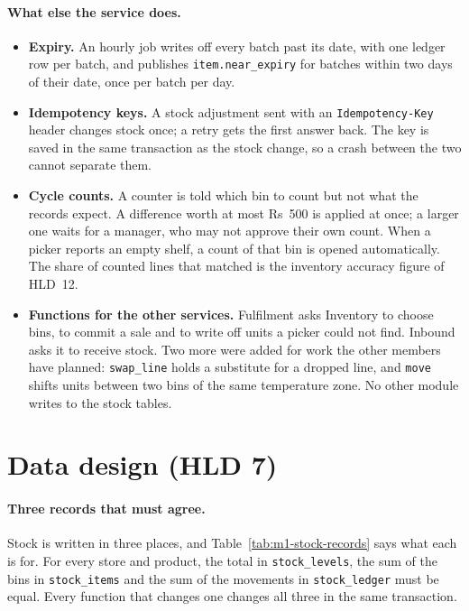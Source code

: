 \paragraph{What else the service does.}
\begin{itemize}
  \item \textbf{Expiry.} An hourly job writes off every batch past its date, with one ledger row per batch, and
    publishes \texttt{item.near\_expiry} for batches within two days of their date, once per batch per day.
  \item \textbf{Idempotency keys.} A stock adjustment sent with an \texttt{Idempotency-Key} header changes stock
    once; a retry gets the first answer back. The key is saved in the same transaction as the stock change, so a
    crash between the two cannot separate them.
  \item \textbf{Cycle counts.} A counter is told which bin to count but not what the records expect. A difference
    worth at most Rs~500 is applied at once; a larger one waits for a manager, who may not approve their own count.
    When a picker reports an empty shelf, a count of that bin is opened automatically. The share of counted lines that
    matched is the inventory accuracy figure of HLD~12.
  \item \textbf{Functions for the other services.} Fulfilment asks Inventory to choose bins, to commit a sale and to
    write off units a picker could not find. Inbound asks it to receive stock. Two more were added for work the
    other members have planned: \texttt{swap\_line} holds a substitute for a dropped line, and \texttt{move}
    shifts units between two bins of the same temperature zone. No other module writes to the stock tables.
\end{itemize}

\section{Data design (HLD 7)}
\label{sec:m1-data}

\paragraph{Three records that must agree.} Stock is written in three places, and
Table~\ref{tab:m1-stock-records} says what each is for. For every store and product, the total in
\texttt{stock\_levels}, the sum of the bins in \texttt{stock\_items} and the sum of the movements in
\texttt{stock\_ledger} must be equal. Every function that changes one changes all three in the same transaction.

